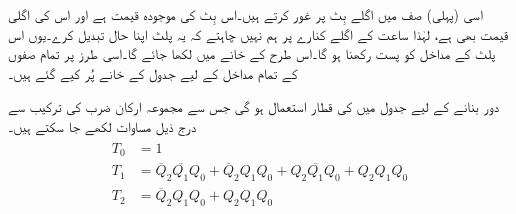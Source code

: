 اسی (پہلی) صف میں اگلے بِٹ  پر غور کرتے ہیں۔اس بِٹ کی موجودہ قیمت  ہے اور اس کی اگلی قیمت بھی  ہے، لہٰذا ساعت کے اگلے کنارے پر ہم نہیں چاہتے کہ یہ پلٹ اپنا حال تبدیل کرے۔یوں اس پلٹ کے مداخل  کو پست رکھنا ہو گا۔اس طرح  کے خانے میں  لکھا جائے گا۔اسی طرز پر تمام صفوں کے تمام مداخل کے لیے جدول کے خانے پُر کیے گئے ہیں۔


دور بنانے کے لیے جدول میں کی قطار استعمال ہو گی جس سے مجموعہ ارکان ضرب کی ترکیب سے درج ذیل مساوات لکھے جا سکتے ہیں۔
\begin{gather}
\begin{aligned}
T_0&=1\\
T_1&=\overline{Q}_2\overline{Q_1} Q_0+\overline{Q}_2 Q_1 Q_0+Q_2\overline{Q_1} Q_0+Q_2Q_1Q_0\\
T_2&=\overline{Q}_2 Q_1 Q_0+Q_2Q_1Q_0
\end{aligned}
\end{gather}
%
